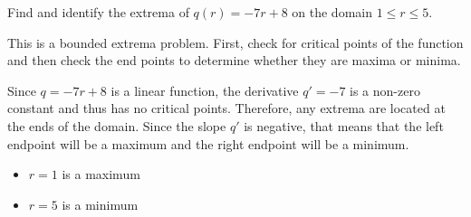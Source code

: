 \documentclass{ximera}
\author{Emma Smith Zbarsky}
\begin{document}
\begin{exercise}

Find and identify the extrema of $q(r) = -7r+8$ on the domain
$1 \leq r \leq 5$.


\begin{hint}
This is a bounded extrema problem. First, check for critical points of
the function and then check the end points to determine whether they are
maxima or minima.
\end{hint}


\begin{hint}
Since $q= -7r+8$ is a linear function, the derivative $q' = -7$ is a
non-zero constant and thus has no critical points. Therefore, any
extrema are located at the ends of the domain. Since the slope $q'$ is
negative, that means that the left endpoint will be a maximum and the
right endpoint will be a minimum.

\begin{itemize}
\item
  $r=1$ is a maximum
\item
  $r=5$ is a minimum
\end{itemize}
\end{hint}


\begin{multipleChoice}
\end{multipleChoice}

\end{exercise}
\end{document}

